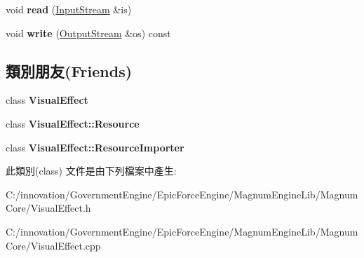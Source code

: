 \begin{DoxyCompactItemize}
\item 
void {\bfseries read} (\hyperlink{class_i_dream_sky_1_1_input_stream}{Input\+Stream} \&is)\hypertarget{class_i_dream_sky_1_1_visual_effect_1_1_pass_a208c7aade3ce2e216ea7df8b1c88266a}{}\label{class_i_dream_sky_1_1_visual_effect_1_1_pass_a208c7aade3ce2e216ea7df8b1c88266a}

\item 
void {\bfseries write} (\hyperlink{class_i_dream_sky_1_1_output_stream}{Output\+Stream} \&os) const \hypertarget{class_i_dream_sky_1_1_visual_effect_1_1_pass_a3648190c6c54753ce51e63ccad2e5837}{}\label{class_i_dream_sky_1_1_visual_effect_1_1_pass_a3648190c6c54753ce51e63ccad2e5837}

\end{DoxyCompactItemize}
\subsection*{類別朋友(Friends)}
\begin{DoxyCompactItemize}
\item 
class {\bfseries Visual\+Effect}\hypertarget{class_i_dream_sky_1_1_visual_effect_1_1_pass_ad19546ee8a8868c73e6f88564fb88462}{}\label{class_i_dream_sky_1_1_visual_effect_1_1_pass_ad19546ee8a8868c73e6f88564fb88462}

\item 
class {\bfseries Visual\+Effect\+::\+Resource}\hypertarget{class_i_dream_sky_1_1_visual_effect_1_1_pass_a7e5f0c0359cb7300a876070f845cb939}{}\label{class_i_dream_sky_1_1_visual_effect_1_1_pass_a7e5f0c0359cb7300a876070f845cb939}

\item 
class {\bfseries Visual\+Effect\+::\+Resource\+Importer}\hypertarget{class_i_dream_sky_1_1_visual_effect_1_1_pass_a316a2d14e00fb787148dd7c1f760c78c}{}\label{class_i_dream_sky_1_1_visual_effect_1_1_pass_a316a2d14e00fb787148dd7c1f760c78c}

\end{DoxyCompactItemize}


此類別(class) 文件是由下列檔案中產生\+:\begin{DoxyCompactItemize}
\item 
C\+:/innovation/\+Government\+Engine/\+Epic\+Force\+Engine/\+Magnum\+Engine\+Lib/\+Magnum\+Core/Visual\+Effect.\+h\item 
C\+:/innovation/\+Government\+Engine/\+Epic\+Force\+Engine/\+Magnum\+Engine\+Lib/\+Magnum\+Core/Visual\+Effect.\+cpp\end{DoxyCompactItemize}

